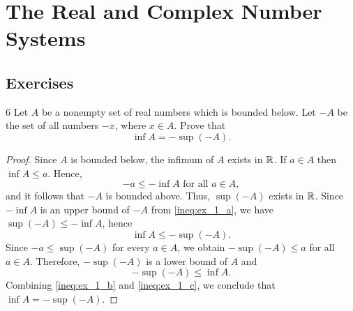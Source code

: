 \section{The Real and Complex Number Systems}
\subsection*{Exercises}

\begin{exercise}{6}
Let $A$ be a nonempty set of real numbers which is bounded below.
Let $-A$ be the set of all numbers $-x$, where $x \in A$.
Prove that \[\inf A = -\sup (-A).\]
\end{exercise}
\begin{proof}
Since $A$ is bounded below, the infimum of $A$ exists in $\mathbb{R}$. 
If $a \in A$ then $\inf A \leq a$. Hence,
\begin{equation}\label{ineq:ex_1_a}
-a \leq -\inf A \text{ for all } a \in A,
\end{equation}
and it follows that $-A$ is bounded above. Thus, $\sup (-A)$ exists in $\mathbb{R}$.
Since $- \inf A$ is an upper bound of $-A$ from \eqref{ineq:ex_1_a}, we have $\sup (-A) \leq -\inf A$, hence 
\begin{equation}\label{ineq:ex_1_b}
\inf A \leq -\sup(-A).
\end{equation}
Since $-a \leq \sup(-A)$ for every $a \in A$, we obtain $-\sup (-A) \leq a$ for all $a \in A$.
Therefore, $-\sup(-A)$ is a lower bound of $A$ and 
\begin{equation}\label{ineq:ex_1_c}
-\sup(-A) \leq  \inf A.
\end{equation}
Combining \eqref{ineq:ex_1_b} and \eqref{ineq:ex_1_c}, we conclude that $\inf A = -\sup (-A)$.
\end{proof}

